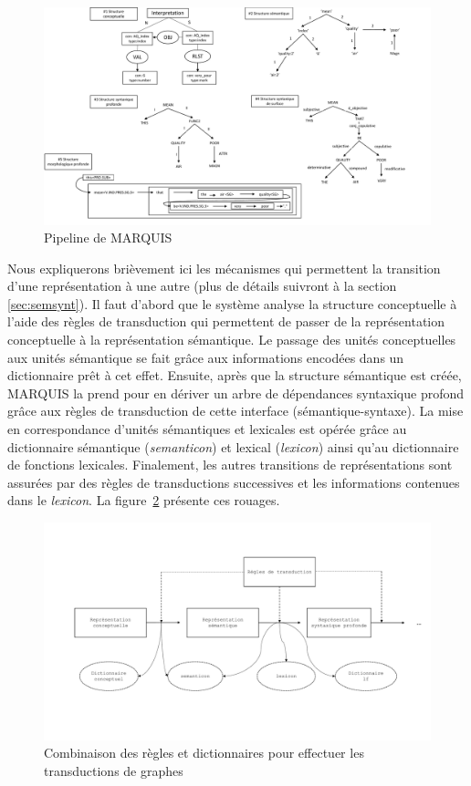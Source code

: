 \begin{figure}[htb]
	\centering
	\includegraphics[width=1\textwidth, trim = {0cm 0cm 0cm 0cm},clip]{ch2/figs/marquis.pdf}
	\caption{Pipeline de MARQUIS \citep{WannerMARQUISGENERATIONUSERTAILORED2010}}
	\label{fig:marquis}
\end{figure}

Nous expliquerons brièvement ici les mécanismes qui permettent la transition d'une représentation à une autre (plus de détails suivront à la section \ref{sec:semsynt}). Il faut d'abord que le système analyse la structure conceptuelle à l'aide des règles de transduction qui permettent de passer de la représentation conceptuelle à la représentation sémantique. Le passage des unités conceptuelles aux unités sémantique se fait grâce aux informations encodées dans un dictionnaire prêt à cet effet. Ensuite, après que la structure sémantique est créée, MARQUIS la prend pour en dériver un arbre de dépendances syntaxique profond grâce aux règles de transduction de cette interface (sémantique-syntaxe). La mise en correspondance d'unités sémantiques et lexicales est opérée grâce au dictionnaire sémantique (\emph{semanticon}) et lexical (\emph{lexicon}) ainsi qu'au dictionnaire de fonctions lexicales. Finalement, les autres transitions de représentations sont assurées par des règles de transductions successives et les informations contenues dans le \emph{lexicon}. La figure~\ref{fig:reglesdict} présente ces rouages.

\begin{figure}[htb]
	\centering
	\includegraphics[width=1\textwidth, trim = {0cm 0cm 0cm 0cm},clip]{ch2/figs/module.pdf}
	\caption{Combinaison des règles et dictionnaires pour effectuer les transductions de graphes \citep{LambreyImplementationcollocationspour2017}}
	\label{fig:reglesdict}
\end{figure}

